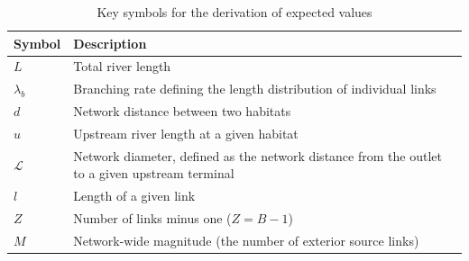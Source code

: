 \documentclass[11pt, class=article, crop=false]{standalone}
\theoremstyle{definition}
\begin{document}
\vspace{0.5cm} 
\begin{table}
    \centering
    \caption{Key symbols for the derivation of expected values}
    \begin{tabularx}{\textwidth}{ll}
        \hline
        Symbol & Description\\
        \hline
        $L$ & Total river length\\
        $\lambda_b$ & Branching rate defining the length distribution of individual links\\
        $d$ & Network distance between two habitats\\
        $u$ & Upstream river length at a given habitat\\
        $\mathcal{L}$ & Network diameter, defined as the network distance from the outlet to a given upstream terminal\\
        $l$ & Length of a given link\\
        $Z$ & Number of links minus one ($Z = B - 1$)\\
        $M$ & Network-wide magnitude (the number of exterior source links)\\
        \hline
    \end{tabularx}
    \label{tab:symbol-nw}
\end{table}
\vspace{0.5cm} 
\end{document}
